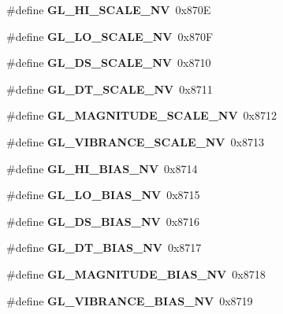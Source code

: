 \begin{DoxyCompactItemize}
\item 
\#define {\bfseries G\+L\+\_\+\+H\+I\+\_\+\+S\+C\+A\+L\+E\+\_\+\+N\+V}~0x870\+E\label{_s_d_l__opengl_8h_a70f140c54af187cbbe0477e90ec02da8}

\item 
\#define {\bfseries G\+L\+\_\+\+L\+O\+\_\+\+S\+C\+A\+L\+E\+\_\+\+N\+V}~0x870\+F\label{_s_d_l__opengl_8h_a29537cf9351e4e69ce258c83463fa158}

\item 
\#define {\bfseries G\+L\+\_\+\+D\+S\+\_\+\+S\+C\+A\+L\+E\+\_\+\+N\+V}~0x8710\label{_s_d_l__opengl_8h_ae8fbfba00eaab20cf204dddb1586ef33}

\item 
\#define {\bfseries G\+L\+\_\+\+D\+T\+\_\+\+S\+C\+A\+L\+E\+\_\+\+N\+V}~0x8711\label{_s_d_l__opengl_8h_a37ac4870954fd3742af4dd081150980d}

\item 
\#define {\bfseries G\+L\+\_\+\+M\+A\+G\+N\+I\+T\+U\+D\+E\+\_\+\+S\+C\+A\+L\+E\+\_\+\+N\+V}~0x8712\label{_s_d_l__opengl_8h_abb9a087a2bfc6fe0b0083abde44a989d}

\item 
\#define {\bfseries G\+L\+\_\+\+V\+I\+B\+R\+A\+N\+C\+E\+\_\+\+S\+C\+A\+L\+E\+\_\+\+N\+V}~0x8713\label{_s_d_l__opengl_8h_a03b3a3440b477229145186c91b4621c6}

\item 
\#define {\bfseries G\+L\+\_\+\+H\+I\+\_\+\+B\+I\+A\+S\+\_\+\+N\+V}~0x8714\label{_s_d_l__opengl_8h_aea516ed2fe457c55c85ee94cdb1beac2}

\item 
\#define {\bfseries G\+L\+\_\+\+L\+O\+\_\+\+B\+I\+A\+S\+\_\+\+N\+V}~0x8715\label{_s_d_l__opengl_8h_af7d601b3102a184f3e2b13436bf4027b}

\item 
\#define {\bfseries G\+L\+\_\+\+D\+S\+\_\+\+B\+I\+A\+S\+\_\+\+N\+V}~0x8716\label{_s_d_l__opengl_8h_aa952c67aca4187cfd340804f03c83f7b}

\item 
\#define {\bfseries G\+L\+\_\+\+D\+T\+\_\+\+B\+I\+A\+S\+\_\+\+N\+V}~0x8717\label{_s_d_l__opengl_8h_a54979ea6eeae6eefc70f6022c72ad235}

\item 
\#define {\bfseries G\+L\+\_\+\+M\+A\+G\+N\+I\+T\+U\+D\+E\+\_\+\+B\+I\+A\+S\+\_\+\+N\+V}~0x8718\label{_s_d_l__opengl_8h_ae0755c87969dbab728fc24055f92e6bb}

\item 
\#define {\bfseries G\+L\+\_\+\+V\+I\+B\+R\+A\+N\+C\+E\+\_\+\+B\+I\+A\+S\+\_\+\+N\+V}~0x8719\label{_s_d_l__opengl_8h_a07661ce478d35f45b9987dc799900c56}


\end{DoxyCompactItemize}

